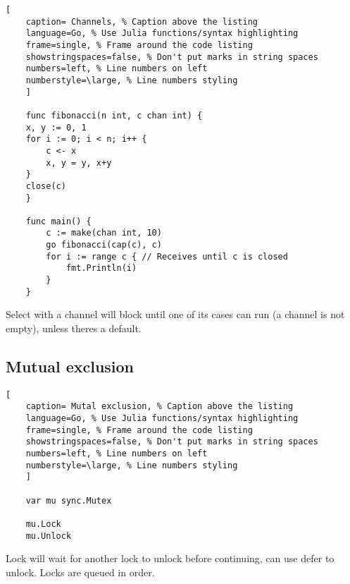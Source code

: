 \documentclass[11pt]{scrartcl} %
\begin{document}
\begin{lstlisting}[
	caption= Channels, % Caption above the listing
	language=Go, % Use Julia functions/syntax highlighting
	frame=single, % Frame around the code listing
	showstringspaces=false, % Don't put marks in string spaces
	numbers=left, % Line numbers on left
	numberstyle=\large, % Line numbers styling
	]

	func fibonacci(n int, c chan int) {
	x, y := 0, 1
	for i := 0; i < n; i++ {
		c <- x
		x, y = y, x+y
	}
	close(c)
	}

	func main() {
		c := make(chan int, 10)
		go fibonacci(cap(c), c)
		for i := range c { // Receives until c is closed
			fmt.Println(i)
		}
	}

\end{lstlisting}

Select with a channel will block until one of its cases can run (a channel is not empty), 
unless theres a default.

\subsection{Mutual exclusion}

\begin{lstlisting}[
	caption= Mutal exclusion, % Caption above the listing
	language=Go, % Use Julia functions/syntax highlighting
	frame=single, % Frame around the code listing
	showstringspaces=false, % Don't put marks in string spaces
	numbers=left, % Line numbers on left
	numberstyle=\large, % Line numbers styling
	]

	var mu sync.Mutex

	mu.Lock
	mu.Unlock 

\end{lstlisting}

Lock will wait for another lock to unlock before continuing, can use defer to unlock. Locks are queued
in order.


\end{document}
